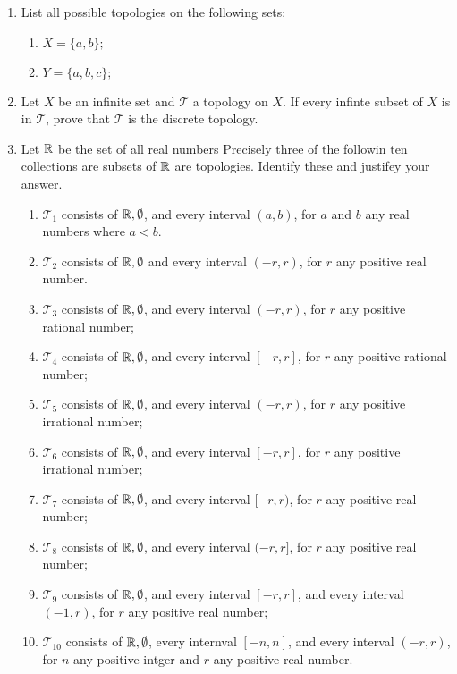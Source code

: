 \documentclass[10pt,a4paper]{report}
\newcommand{\TT}{\mathcal{T}}
\begin{document}
\begin{enumerate}
\item List all possible topologies on the following sets:
\begin{enumerate}
	\item $X = \{a,b\};$
	\item $Y = \{a,b,c\};$
\end{enumerate}

\item Let $X$ be an infinite set and $\TT$ a topology on $X$.  If every infinte subset of $X$ is in $\TT$, prove that $\TT$ is the discrete topology.

\item Let $\mathbb{R}$ be the set of all real numbers Precisely three of the followin ten collections are subsets of $\mathbb{R}$ are topologies.  Identify these and justifey your answer.
\begin{enumerate}[label=(\roman*)]
	\item $\TT_1$ consists of $\mathbb{R}, \emptyset$, and every interval $(a,b)$, for $a$ and $b$ any real numbers where $a<b$.
	\item $\TT_2$ consists of $\mathbb{R}, \emptyset$ and every interval $(-r,r)$, for $r$ any positive real number.
	\item $\TT_3$ consists of $\mathbb{R},\emptyset$, and every interval $(-r,r)$, for $r$ any positive rational number;
	\item $\TT_4$ consists of $\mathbb{R},\emptyset$, and every interval $[-r,r]$, for $r$ any positive rational number;
	\item $\TT_5$ consists of $\mathbb{R},\emptyset$, and every interval $(-r,r)$, for $r$ any positive irrational number;
	\item $\TT_6$ consists of $\mathbb{R},\emptyset$, and every interval $[-r,r]$, for $r$ any positive irrational number;
	\item $\TT_7$ consists of $\mathbb{R},\emptyset$, and every interval $[-r,r)$, for $r$ any positive real number;
	\item $\TT_8$ consists of $\mathbb{R},\emptyset$, and every interval $(-r,r]$, for $r$ any positive real number;
	\item $\TT_9$ consists of $\mathbb{R},\emptyset$, and every interval $[-r,r]$,  and every interval $(-1,r)$, for $r$ any positive real number;
	\item $\TT_{10}$ consists of $\mathbb{R}, \emptyset$, every internval $[-n,n]$, and every interval $(-r,r)$, for $n$ any positive intger and $r$ any positive real number.
\end{enumerate}

\end{enumerate}
\end{document}
